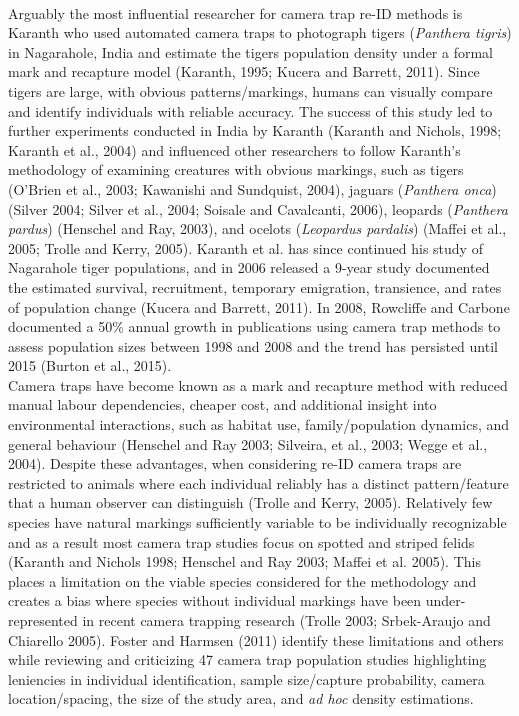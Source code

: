 \documentclass[11pt]{article}
\begin{document}
\newline
\\
Arguably the most influential researcher for camera trap re-ID methods is Karanth who used automated camera traps to photograph tigers (\textit{Panthera tigris}) in Nagarahole, India and estimate the tigers population density under a formal mark and recapture model (Karanth, 1995; Kucera and Barrett, 2011). Since tigers are large, with obvious patterns/markings, humans can visually compare and identify individuals with reliable accuracy. The success of this study led to further experiments conducted in India by Karanth (Karanth and Nichols, 1998; Karanth et al., 2004) and influenced other researchers to follow Karanth's methodology of examining creatures with obvious markings, such as tigers (O'Brien et al., 2003; Kawanishi and Sundquist, 2004), jaguars (\textit{Panthera onca}) (Silver 2004; Silver et al., 2004; Soisale and Cavalcanti, 2006), leopards (\textit{Panthera pardus}) (Henschel and Ray, 2003), and ocelots (\textit{Leopardus pardalis}) (Maffei et al., 2005; Trolle and Kerry, 2005). Karanth et al. has since continued his study of Nagarahole tiger populations, and in 2006 released a 9-year study documented the estimated survival, recruitment, temporary emigration, transience, and rates of population change (Kucera and Barrett, 2011). In 2008, Rowcliffe and Carbone documented a 50\% annual growth in publications using camera trap methods to assess population sizes between 1998 and 2008 and the trend has persisted until 2015 (Burton et al., 2015).
\newline
\\
Camera traps have become known as a mark and recapture method with reduced manual labour dependencies, cheaper cost, and additional insight into environmental interactions, such as habitat use, family/population dynamics, and general behaviour (Henschel and Ray 2003; Silveira, et al., 2003; Wegge et al., 2004). Despite these advantages, when considering re-ID camera traps are restricted to animals where each individual reliably has a distinct pattern/feature that a human observer can distinguish (Trolle and Kerry, 2005). Relatively few species have natural markings sufficiently variable to be individually recognizable and as a result most camera trap studies focus on spotted and striped felids (Karanth and Nichols 1998; Henschel and Ray 2003; Maffei et al. 2005). This places a limitation on the viable species considered for the methodology and creates a bias where species without individual markings have been under-represented in recent camera trapping research (Trolle 2003; Srbek-Araujo and Chiarello 2005). Foster and Harmsen (2011) identify these limitations and others while reviewing and criticizing 47 camera trap population studies highlighting leniencies in individual identification, sample size/capture probability, camera location/spacing, the size of the study area, and \textit{ad hoc} density estimations.
\end{document}
